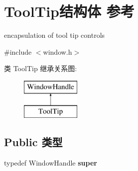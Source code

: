 \hypertarget{struct_tool_tip}{}\section{Tool\+Tip结构体 参考}
\label{struct_tool_tip}


encapsulation of tool tip controls  




{\ttfamily \#include $<$window.\+h$>$}

类 Tool\+Tip 继承关系图\+:\begin{figure}[H]
\begin{center}
\leavevmode
\includegraphics[height=2.000000cm]{struct_tool_tip}
\end{center}
\end{figure}
\subsection*{Public 类型}
\begin{DoxyCompactItemize}
\item 
\mbox{\label{struct_tool_tip_a0af896802457204382e5f6db04126d17}} 
typedef Window\+Handle {\bfseries super}
\end{DoxyCompactItemize}
